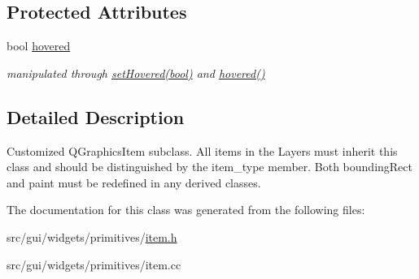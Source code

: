 \subsection*{Protected Attributes}
\begin{DoxyCompactItemize}
\item 
bool \hyperlink{classprim_1_1Item_a36459a945e47fc3acd2c4aeeba1bfa35}{hovered}\hypertarget{classprim_1_1Item_a36459a945e47fc3acd2c4aeeba1bfa35}{}\label{classprim_1_1Item_a36459a945e47fc3acd2c4aeeba1bfa35}

\begin{DoxyCompactList}\small\item\em manipulated through \hyperlink{classprim_1_1Item_a58b962da55176665e1e53c735f2d3e08}{set\+Hovered(bool)} and \hyperlink{classprim_1_1Item_a36459a945e47fc3acd2c4aeeba1bfa35}{hovered()} \end{DoxyCompactList}\end{DoxyCompactItemize}


\subsection{Detailed Description}
Customized Q\+Graphics\+Item subclass. All items in the Layers must inherit this class and should be distinguished by the item\+\_\+type member. Both bounding\+Rect and paint must be redefined in any derived classes. 

The documentation for this class was generated from the following files\+:\begin{DoxyCompactItemize}
\item 
src/gui/widgets/primitives/\hyperlink{item_8h}{item.\+h}\item 
src/gui/widgets/primitives/item.\+cc\end{DoxyCompactItemize}
